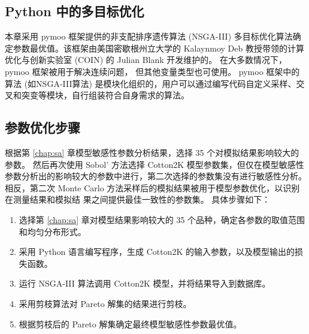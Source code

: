 \subsection{Python 中的多目标优化}
本章采用 pymoo 框架提供的非支配排序遗传算法 (NSGA-III) 多目标优化算法确定参数最优值。该框架由美国密歇根州立大学的 Kalaynmoy Deb 教授带领的计算优化与创新实验室 (COIN) 的 Julian Blank 开发维护的。%
在大多数情况下，pymoo 框架被用于解决连续问题， 但其他变量类型也可使用。%
pymoo 框架中的算法 (如NSGA-III算法) 是模块化组织的，用户可以通过编写代码自定义采样、交叉和突变等模块，自行组装符合自身需求的算法。%

\subsection{参数优化步骤}
根据第 \ref{chap:sa} 章模型敏感性参数分析结果，选择 35 个对模拟结果影响较大的参数。
然后再次使用 Sobol' 方法选择 Cotton2K 模型参数集，但仅在模型敏感性参数分析出的影响较大的参数中进行，第二次选择的参数集没有进行敏感性分析。%
相反，第二次 Monte Carlo 方法采样后的模拟结果被用于模型参数优化，以识别在测量结果和模拟结 果之间提供最佳一致性的参数集。%
具体步骤如下：
\begin{enumerate}
    \item 选择第 \ref{chap:sa} 章对模型结果影响较大的 35 个品种，确定各参数的取值范围和均匀分布形式。
    \item 采用 Python 语言编写程序，生成 Cotton2K 的输入参数，以及模型输出的损失函数。
    \item 运行 NSGA-III 算法调用 Cotton2K 模型，并将结果导入到数据库。
    \item 采用剪枝算法对 Pareto 解集的结果进行剪枝。
    \item 根据剪枝后的 Pareto 解集确定最终模型敏感性参数最优值。
\end{enumerate}

